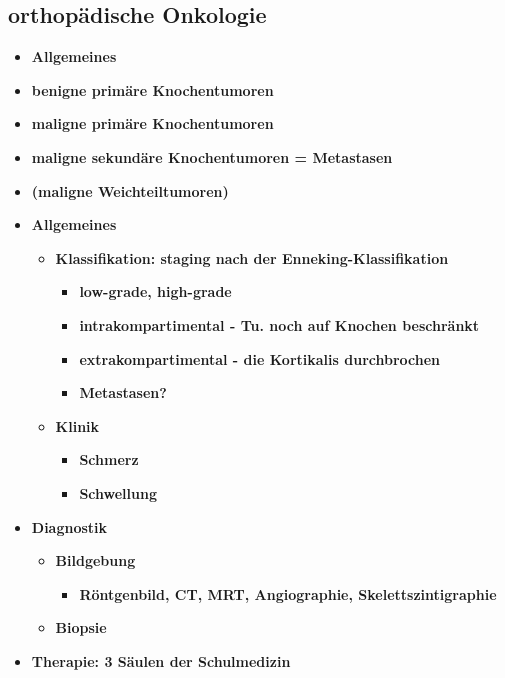 \subsection{orthopädische Onkologie}
	\begin{itemize}
		\item \textbf{Allgemeines}
		\item \textbf{benigne primäre Knochentumoren}
		\item \textbf{maligne primäre Knochentumoren}
		\item \textbf{maligne sekundäre Knochentumoren = Metastasen}
		\item \textbf{(maligne Weichteiltumoren)}
		\item \textbf{Allgemeines}
			\begin{itemize}
				\item \textbf{Klassifikation: staging nach der Enneking-Klassifikation}
					\begin{itemize}
						\item \textbf{low-grade, high-grade}
						\item \textbf{intrakompartimental - Tu. noch auf Knochen beschränkt}
						\item \textbf{extrakompartimental - die Kortikalis durchbrochen}
						\item \textbf{Metastasen?}
					\end{itemize}
				\item \textbf{Klinik}
					\begin{itemize}
						\item \textbf{Schmerz}
						\item \textbf{Schwellung}
					\end{itemize}
			\end{itemize}
		\item \textbf{Diagnostik}
			\begin{itemize}
				\item \textbf{Bildgebung}
					\begin{itemize}
						\item \textbf{Röntgenbild, CT, MRT, Angiographie, Skelettszintigraphie}
					\end{itemize}
				\item \textbf{Biopsie}
			\end{itemize}
		\item \textbf{Therapie: 3 Säulen der Schulmedizin}
 	\end{itemize}


